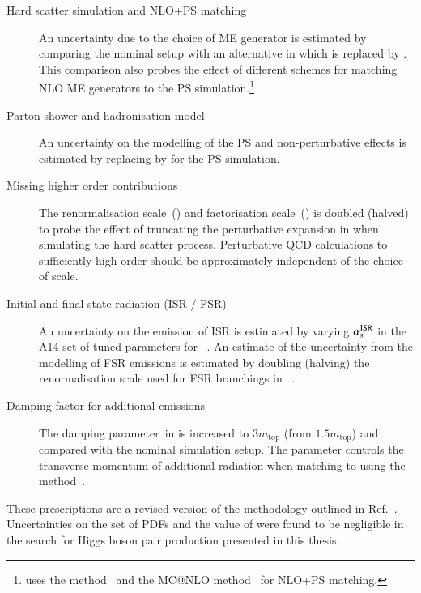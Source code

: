 \begin{description}

\item[Hard scatter simulation and NLO+PS matching] An uncertainty due to the
  choice of ME generator is estimated by comparing the nominal setup with an
  alternative in which \POWHEGBOX[v2] is replaced by \MGNLO. This comparison
  also probes the effect of different schemes for matching NLO ME generators to
  the PS simulation.\footnote{\POWHEGBOX[v2] uses the \POWHEG
    method~\cite{Nason:2004rx,Frixione:2007vw,Alioli:2010xd} and \MGNLO the
    MC@NLO method~\cite{Frixione:2002ik} for NLO+PS matching.}

\item[Parton shower and hadronisation model] An uncertainty on the modelling of
  the PS and non-perturbative effects is estimated by replacing \PYTHIA[8] by
  \HERWIG[7] for the PS simulation.

\item[Missing higher order contributions] The renormalisation scale~(\muR) and
  factorisation scale~(\muF) is doubled (halved) to probe the effect of
  truncating the perturbative expansion in \alphas when simulating the hard
  scatter process. Perturbative QCD calculations to sufficiently high order
  should be approximately independent of the choice of scale.

\item[Initial and final state radiation (ISR / FSR)] An uncertainty on the
  emission of ISR is estimated by varying $\alpha_{\text{s}}^\text{ISR}$ in the A14 set of
  tuned parameters for \PYTHIA[8]~\cite{ATL-PHYS-PUB-2014-021}.
  An estimate of the uncertainty from the modelling of FSR emissions is
  estimated by doubling (halving) the renormalisation scale used for FSR
  branchings in
  \PYTHIA[8]~\cite{Sjostrand:2014zea,Mrenna:2016sih,pythia-variations-online}.

\item[Damping factor for additional emissions] The damping parameter~\hdamp in
  \POWHEGBOX[v2] is increased to $3 m_\text{top}$ (from $1.5 m_\text{top}$) and
  compared with the nominal simulation setup. The \hdamp parameter controls the
  transverse momentum of additional radiation when matching \POWHEGBOX[v2] to
  \PYTHIA[8] using the
  \POWHEG-method~\cite{ATL-PHYS-PUB-2016-020,ATL-PHYS-PUB-2020-023}.

\end{description}
These prescriptions are a revised version of the methodology outlined in
Ref.~\cite{ATL-PHYS-PUB-2020-023}. Uncertainties on the \NNPDF[3.0nlo] set of
PDFs and the value of \alphas were found to be negligible in the search for
Higgs boson pair production presented in this thesis.

